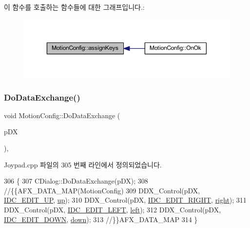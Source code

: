 이 함수를 호출하는 함수들에 대한 그래프입니다.\+:
\nopagebreak
\begin{figure}[H]
\begin{center}
\leavevmode
\includegraphics[width=350pt]{class_motion_config_a73d6bc239e8abd59b68f23ddaaf6daf4_icgraph}
\end{center}
\end{figure}
\mbox{\label{class_motion_config_a1f27a900666b5c804f255f39b32d5dfd}} 
\subsubsection{\texorpdfstring{Do\+Data\+Exchange()}{DoDataExchange()}}
{\footnotesize\ttfamily void Motion\+Config\+::\+Do\+Data\+Exchange (\begin{DoxyParamCaption}\item[{C\+Data\+Exchange $\ast$}]{p\+DX }\end{DoxyParamCaption})\hspace{0.3cm}{\ttfamily [protected]}, {\ttfamily [virtual]}}



Joypad.\+cpp 파일의 305 번째 라인에서 정의되었습니다.


\begin{DoxyCode}
306 \{
307   CDialog::DoDataExchange(pDX);
308   \textcolor{comment}{//\{\{AFX\_DATA\_MAP(MotionConfig)}
309   DDX\_Control(pDX, \mbox{\hyperlink{resource_8h_ae0645e746a25d4d061e3fae80babcc78}{IDC\_EDIT\_UP}}, \mbox{\hyperlink{class_motion_config_a44c25ec4fbd230d6fe19416d8c280157}{up}});
310   DDX\_Control(pDX, \mbox{\hyperlink{resource_8h_ae29438ab510968afa9068e0c6b80ed57}{IDC\_EDIT\_RIGHT}}, \mbox{\hyperlink{class_motion_config_ae9203bef30efdd067ea44d1f7cded8dc}{right}});
311   DDX\_Control(pDX, \mbox{\hyperlink{resource_8h_ae8bd1d3525011019fb5ff9406e0d2404}{IDC\_EDIT\_LEFT}}, \mbox{\hyperlink{class_motion_config_a634ed163b30d08aceb8573542ee7fc07}{left}});
312   DDX\_Control(pDX, \mbox{\hyperlink{resource_8h_a3c298d6303318c2193f262cfae3e413c}{IDC\_EDIT\_DOWN}}, \mbox{\hyperlink{class_motion_config_a0fd0b825d61a2959b3dd20ea3c0fb9ad}{down}});
313   \textcolor{comment}{//\}\}AFX\_DATA\_MAP}
314 \}
\end{DoxyCode}
\mbox{\label{class_motion_config_a3b2f649ce95dfb9f6b1efb8c7d8c9213}} 
